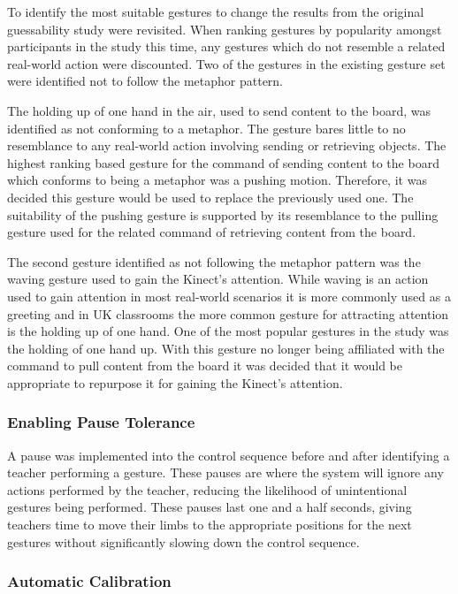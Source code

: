 \documentclass[link]{IWCOMP}
\begin{document}
To identify the most suitable gestures to change the results from the original guessability study were revisited.
When ranking gestures by popularity amongst participants in the study this time, any gestures which do not resemble a related real-world action were discounted.
Two of the gestures in the existing gesture set were identified not to follow the metaphor pattern.

The holding up of one hand in the air, used to send content to the board, was identified as not conforming to a metaphor.
The gesture bares little to no resemblance to any real-world action involving sending or retrieving objects.
The highest ranking based gesture for the command of sending content to the board which conforms to being a metaphor was a pushing motion.
Therefore, it was decided this gesture would be used to replace the previously used one.
The suitability of the pushing gesture is supported by its resemblance to the pulling gesture used for the related command of retrieving content from the board.

The second gesture identified as not following the metaphor pattern was the waving gesture used to gain the Kinect's attention.
While waving is an action used to gain attention in most real-world scenarios it is more commonly used as a greeting and in UK classrooms the more common gesture for attracting attention is the holding up of one hand.
One of the most popular gestures in the study was the holding of one hand up.
With this gesture no longer being affiliated with the command to pull content from the board it was decided that it would be appropriate to repurpose it for gaining the Kinect's attention.

\subsubsection{Enabling Pause Tolerance}  
\label{subsubsec:studyImplementationPauseTolerance}

A pause was implemented into the control sequence before and after identifying a teacher performing a gesture.
These pauses are where the system will ignore any actions performed by the teacher, reducing the likelihood of unintentional gestures being performed.
These pauses last one and a half seconds, giving teachers time to move their limbs to the appropriate positions for the next gestures without significantly slowing down the control sequence.

\subsubsection{Automatic Calibration}  
\label{subsubsec:studyImplementationAutoCalibration}
\end{document}

